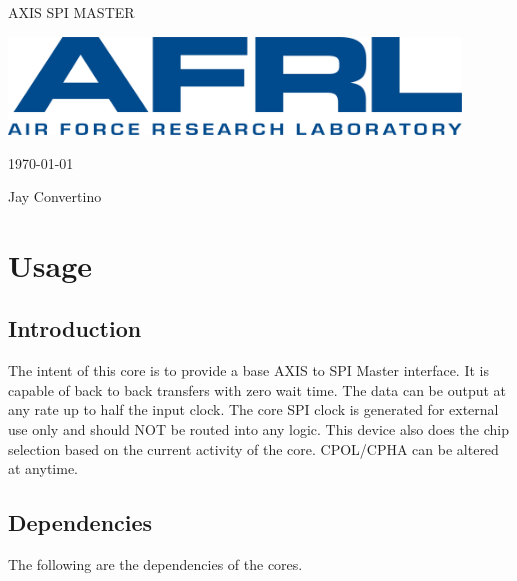 \begin{titlepage}
  \begin{center}

  {\Huge AXIS SPI MASTER}

  \vspace{25mm}

  \includegraphics[width=0.90\textwidth,height=\textheight,keepaspectratio]{img/AFRL.png}

  \vspace{25mm}

  \today

  \vspace{15mm}

  {\Large Jay Convertino}

  \end{center}
\end{titlepage}

\tableofcontents

\newpage

\section{Usage}

\subsection{Introduction}

\par
The intent of this core is to provide a base AXIS to SPI Master interface. It is capable of back to back transfers with zero wait time.
The data can be output at any rate up to half the input clock. The core SPI clock is generated for external use only and should
NOT be routed into any logic. This device also does the chip selection based on the current activity of the core. CPOL/CPHA can
be altered at anytime.

\subsection{Dependencies}

\par
The following are the dependencies of the cores.

